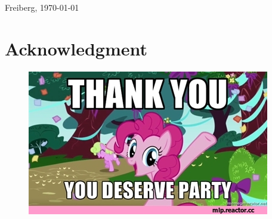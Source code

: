 \documentclass[
	 11pt,         %
	 a4paper,      %
	 oneside,
	 ]{article}
\newcommand{\mydozent}{Prof. Jung}
\newcommand{\mydozentTwo}{Matthias Lenk}
\newcommand{\emptypage}[0]{
	\clearpage
	\thispagestyle{empty}
	\mbox{}
	\newpage
}
\begin{document}
Freiberg, \today \hspace{2cm} \underline{\phantom{Platz für die Unterschrift}}
\clearpage

\emptypage
\thispagestyle{empty}
\section*{Acknowledgment} %
\label{sec:danksagung}




\begin{figure}[htbp]
	\includegraphics[width=\textwidth]{../assets/my-little-pony-mlp-other-261396.jpeg}
\end{figure}


\emptypage
\setcounter{tocdepth}{5}
\tableofcontents
\clearpage
\end{document}
